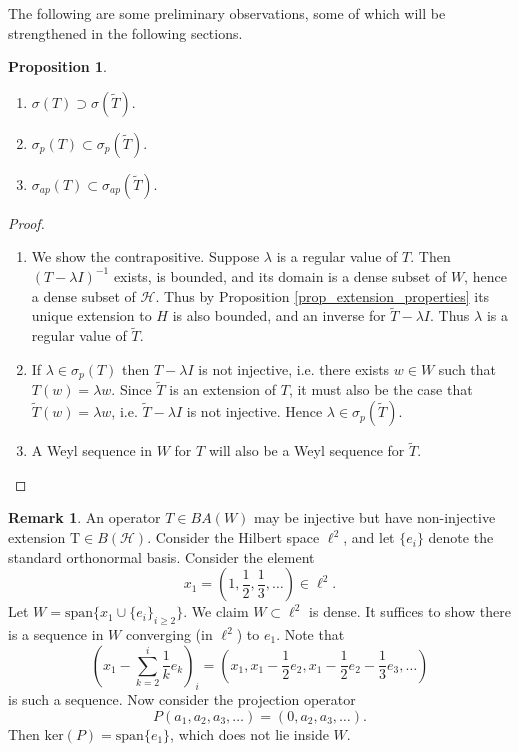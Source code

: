 \documentclass{dcthesis}
\numberwithin{equation}{section}
\numberwithin{equation}{section}
\theoremstyle{definition}
\newtheorem{proposition}[equation]{Proposition}
\newtheorem{remark}[equation]{Remark}
\begin{document}
The following are some preliminary observations, some of which will be strengthened in the following sections.
\begin{proposition}
\label{prop_basic_spectrum_inclusions}
	\hfill
	\begin{enumerate}
		\item $\sigma(T)\supset\sigma(\tilde{T})$.
		\item $\sigma_p(T)\subset \sigma_p(\tilde{T})$.
		\item $\sigma_{ap}(T)\subset\sigma_{ap}(\tilde{T})$.
	\end{enumerate}
\end{proposition}
\begin{proof}
	\hfill
	\begin{enumerate}
		\item We show the contrapositive. Suppose $\lambda$ is a regular value of $T$. Then $(T-\lambda I)^{-1}$ exists, is bounded, and its domain is a dense subset of $W$, hence a dense subset of $\mathcal{H}$. Thus by Proposition \ref{prop_extension_properties} its unique extension to $H$ is also bounded, and an inverse for $\tilde{T}-\lambda I$. Thus $\lambda$ is a regular value of $\tilde{T}$.  
		\item If $\lambda\in\sigma_p(T)$ then $T-\lambda I$ is not injective, i.e. there exists $w\in W$ such that $T(w)=\lambda w$. Since $\tilde{T}$ is an extension of $T$, it must also be the case that $\tilde{T}(w)=\lambda w$, i.e. $\tilde{T}-\lambda I$ is not injective. Hence $\lambda\in\sigma_p(\tilde{T})$.
		\item A Weyl sequence in $W$ for $T$ will also be a Weyl sequence for $\tilde{T}$.
	\end{enumerate}
\end{proof}

\begin{remark}
	An operator $T\in BA(W)$ may be injective but have non-injective extension $\text{T}\in B(\mathcal{H})$. Consider the Hilbert space $\ell^2$, and let $\{e_i\}$ denote the standard orthonormal basis. Consider the element 
	\begin{equation*}
		x_1 = (1, \frac{1}{2}, \frac{1}{3}, \dots) \in \ell^2.
	\end{equation*}
	Let $W = \text{span}\{x_1\cup \{e_i\}_{i\geq 2}\}$. We claim $W\subset \ell^2$ is dense. It suffices to show there is a sequence in $W$ converging (in $\ell^2$) to $e_1$. Note that 
	\begin{equation*}
		\left( x_1 - \sum_{k=2}^{i}\frac{1}{k}e_k \right)_i = \left( x_1, x_1 - \frac{1}{2}e_2, x_1 - \frac{1}{2}e_2 - \frac{1}{3}e_3, \dots \right)
	\end{equation*}
	is such a sequence. Now consider the projection operator 
	\begin{equation*}
		P(a_1,a_2,a_3,\dots) = (0, a_2, a_3, \dots).
	\end{equation*}
	Then $\text{ker}(P)=\text{span}\{e_1\}$, which does not lie inside $W$.
\end{remark}
\end{document}
